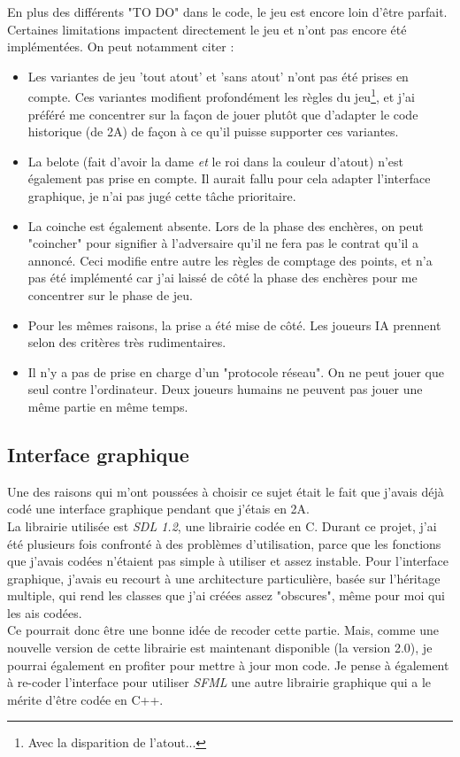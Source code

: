 \documentclass[a4paper,11pt]{article}
\begin{document}
En plus des différents "TO DO" dans le code, le jeu est encore loin d'être parfait. Certaines limitations impactent directement le jeu et n'ont pas encore été implémentées. On peut notamment citer :
\begin{itemize}
\item Les variantes de jeu 'tout atout' et 'sans atout' n'ont pas été prises en compte. Ces variantes modifient profondément les règles du jeu\footnote{Avec la disparition de l'atout...}, et j'ai préféré me concentrer sur la façon de jouer plutôt que d'adapter le code historique (de 2A) de façon à ce qu'il puisse supporter ces variantes.
\item La belote (fait d'avoir la dame \textit{et} le roi dans la couleur d'atout) n'est également pas prise en compte. Il aurait fallu pour cela adapter l'interface graphique, je n'ai pas jugé cette tâche prioritaire.
\item La coinche est également absente. Lors de la phase des enchères, on peut "coincher" pour signifier à l'adversaire qu'il ne fera pas le contrat qu'il a annoncé. Ceci modifie entre autre les règles de comptage des points, et n'a pas été implémenté car j'ai laissé de côté la phase des enchères pour me concentrer sur le phase de jeu.
\item Pour les mêmes raisons, la prise a été mise de côté. Les joueurs IA prennent selon des critères très rudimentaires.
\item Il n'y a pas de prise en charge d'un "protocole réseau". On ne peut jouer que seul contre l'ordinateur. Deux joueurs humains ne peuvent pas jouer une même partie en même temps.
\end{itemize}

\subsection{Interface graphique}

Une des raisons qui m'ont poussées à choisir ce sujet était le fait que j'avais déjà codé une interface graphique pendant que j'étais en 2A.\\
La librairie utilisée est \textit{SDL 1.2}, une librairie codée en C. Durant ce projet, j'ai été plusieurs fois confronté à des problèmes d'utilisation, parce que les fonctions que j'avais codées n'étaient pas simple à utiliser et assez instable. Pour l'interface graphique,  j'avais eu recourt à une architecture particulière, basée sur l'héritage multiple, qui rend les classes que j'ai créées assez "obscures", même pour moi qui les ais codées. \\
Ce pourrait donc être une bonne idée de recoder cette partie. Mais, comme une nouvelle version de cette librairie est maintenant disponible (la version 2.0), je pourrai également en profiter pour mettre à jour mon code. Je pense à également à re-coder l'interface pour utiliser \textit{SFML} une autre librairie graphique qui a le mérite d'être codée en C++.\\
\end{document}
